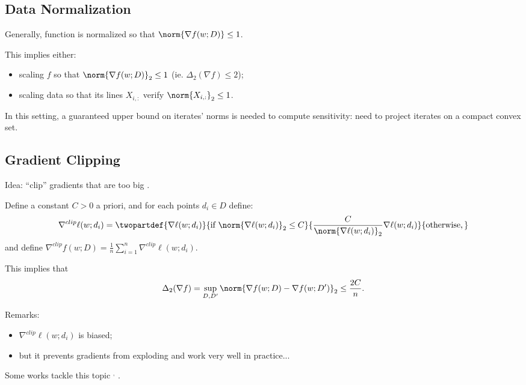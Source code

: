 \documentclass[notheorems]{beamer}
\begin{document}
\subsection{Data Normalization}
\label{sec:data_normalization}

\begin{frame}
  Generally, function is normalized so that $\norm{\nabla f(w; D)} \le 1$.

  This implies either:
  \begin{itemize}
  \item scaling $f$ so that $\norm{\nabla f(w; D)}_2 \le 1$ (ie. $\Delta_2(\nabla f) \le 2$);
  \item scaling data so that its lines $X_{i,:}$ verify $\norm{X_{i,:}}_2 \le 1$.
  \end{itemize}

  \vspace{1em}

  In this setting, a guaranteed upper bound on iterates' norms is needed to compute sensitivity: need to project iterates on a compact convex set.
\end{frame}

\subsection{Gradient Clipping}
\label{sub:gradient_clipping}

\begin{frame}
  Idea: ``clip'' gradients that are too big .

  \vspace{1em}

  Define a constant $C > 0$ a priori, and for each points $d_i \in D$ define:
  \begin{align*}
    \nabla^{clip} \ell(w; d_i) = \twopartdef
    {\nabla \ell(w; d_i)}{\text{if } \norm{\nabla \ell(w; d_i)}_2 \le C}
    {\frac{C}{\norm{\nabla \ell(w; d_i)}_2} \nabla \ell(w; d_i)}{\text{otherwise},}
  \end{align*}
  and define $\nabla^{clip} f(w; D) = \frac 1n \sum_{i=1}^n \nabla^{clip}\ell(w; d_i)$.

  This implies that
  \begin{align*}
    \Delta_2(\nabla f) = \sup_{D,D'} \norm{\nabla f(w; D) - \nabla f(w; D')}_2 \le \frac{2C}{n}.
  \end{align*}
\end{frame}

\begin{frame}
  Remarks:
  \begin{itemize}
  \item $\nabla^{clip} \ell(w; d_i)$ is biased;
  \item but it prevents gradients from exploding and work very well in practice...
  \end{itemize}

  Some works tackle this topic $^,$ .
\end{frame}
\end{document}
